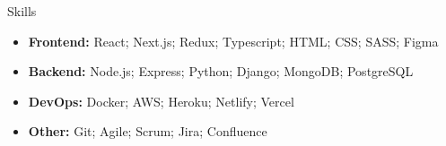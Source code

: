 \documentclass[]{mcdowellcv}
\begin{document}
	\begin{cvsection}{Skills}
		\begin{cvsubsection}{}{}{}	
			\begin{itemize}
				\item \textbf{Frontend:} React; Next.js; Redux; Typescript; HTML; CSS; SASS; Figma
				\item \textbf{Backend:} Node.js; Express; Python; Django; MongoDB; PostgreSQL
				\item \textbf{DevOps:} Docker; AWS; Heroku; Netlify; Vercel
				\item \textbf{Other:} Git; Agile; Scrum; Jira; Confluence
			\end{itemize}
		\end{cvsubsection}
	\end{cvsection}
	
\end{document}
